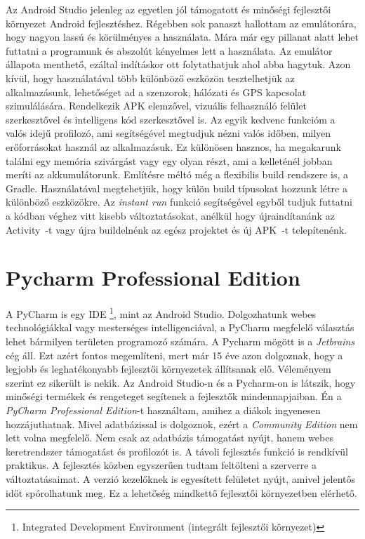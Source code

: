 \documentclass{thesis-ekf}
\theoremstyle{definition}
\theoremstyle{remark}
\begin{document}
Az Android Studio jelenleg az egyetlen jól támogatott és minőségi fejlesztői környezet Android fejlesztéshez.
Régebben sok panaszt hallottam az emulátorára, hogy nagyon lassú és körülményes a használata.
Mára már egy pillanat alatt lehet futtatni a programunk és abszolút kényelmes lett a használata.
Az emulátor állapota menthető, ezáltal indításkor ott folytathatjuk ahol abba hagytuk. Azon kívül, hogy használatával több különböző eszközön tesztelhetjük az alkalmazásunk, lehetőséget ad a szenzorok, hálózati és GPS kapcsolat szimulálására. 
Rendelkezik APK elemzővel, vizuális felhasználó felület szerkesztővel és intelligens kód szerkesztővel is.
Az egyik kedvenc funkcióm a valós idejű profilozó, ami segítségével megtudjuk nézni valós időben, milyen erőforrásokat használ az alkalmazásuk.
Ez különösen hasznos, ha megakarunk találni egy memória szivárgást vagy egy olyan részt, ami a kelleténél jobban meríti az akkumulátorunk.
Említésre méltó még a flexibilis build rendszere is, a Gradle. Használatával megtehetjük, hogy külön build típusokat hozzunk létre a különböző eszközökre.
Az \emph{instant run} funkció segítségével egyből tudjuk futtatni a kódban véghez vitt kisebb változtatásokat, anélkül hogy újraindítanánk az Activity~-t vagy újra buildelnénk az egész projektet és új APK~-t telepítenénk.
\cite{androidstudio}

\section{Pycharm Professional Edition}

A PyCharm is egy IDE \footnote{Integrated Development Environment (integrált fejlesztői környezet)}, mint az Android Studio.
Dolgozhatunk webes technológiákkal vagy mesterséges intelligenciával, a PyCharm megfelelő választás lehet bármilyen területen programozó számára.
A Pycharm mögött is a \emph{Jetbrains} cég áll. Ezt azért fontos megemlíteni, mert már 15 éve azon dolgoznak, hogy a legjobb és leghatékonyabb fejlesztői környezetek állítsanak elő.
Véleményem szerint ez sikerült is nekik. Az Android Studio-n és a Pycharm-on  is látszik, hogy minőségi termékek és rengeteget segítenek a fejlesztők mindennapjaiban.
Én a \emph{PyCharm Professional Edition}-t használtam, amihez a diákok ingyenesen hozzájuthatnak.
Mivel adatbázissal is dolgoznok, ezért a \emph{Community Edition} nem lett volna megfelelő.
Nem csak az adatbázis támogatást nyújt, hanem webes keretrendszer támogatást és profilozót is.
A távoli fejlesztés funkció is rendkívül praktikus. A fejlesztés közben egyszerűen tudtam feltölteni a szerverre a változtatásaimat.
A verzió kezelőknek is egyesített felületet nyújt, amivel jelentős időt spórolhatunk meg.\cite{pycharm}
Ez a lehetőség mindkettő fejlesztői környezetben elérhető.
\end{document}
